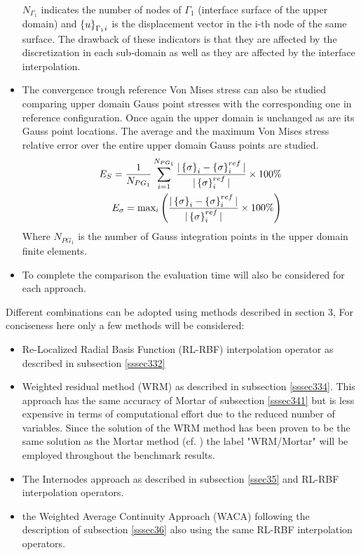 \begin{itemize}
\begin{eqnarray}
 \end{eqnarray}
 $N_{\Gamma_1}$ indicates the number of nodes of $\Gamma_1$ (interface surface  of the upper domain) and $\left\lbrace{u}\right \rbrace_{\Gamma_1i}$ is the displacement vector in the i-th node of the same surface.
 The drawback of these indicators is that they are affected by the discretization in each sub-domain as well as they are affected by the interface interpolation.
 \item The convergence trough reference Von Mises stress can also be studied comparing upper domain Gauss point stresses with the corresponding one in reference configuration. Once again the upper domain is unchanged as are its Gauss point locations. The average and the maximum Von Mises stress relative error over the entire upper domain Gauss points are studied.
 \begin{eqnarray}
 E_{S}=\frac{1}{N_{PG_1}}\sum_{i=1}^{N_{PG_1}}\frac{|\left\lbrace{\sigma}\right \rbrace_{i}-\left\lbrace{\sigma}\right \rbrace^{ref}_{i}|}{|\left\lbrace{\sigma}\right \rbrace^{ref}_{i}|}\times 100 \%  \\
 E_{\sigma}=
 \text{max}_i
  \left(\frac{|\left\lbrace{\sigma}\right \rbrace_{i}-\left\lbrace{\sigma}\right \rbrace^{ref}_{i}|}{|\left\lbrace{\sigma}\right \rbrace^{ref}_{i}|}\times 100 \%   \right) 
 \end{eqnarray}
 Where $N_{PG_1}$ is the number of Gauss integration points in the upper domain finite elements.
 \item To complete the comparison the evaluation time will also be considered for each approach.
 \end{itemize}
 Different combinations can be adopted using methods described in section 3, For conciseness here only a few methods will be considered:
 \begin{itemize}
     \item Re-Localized Radial Basis Function (RL-RBF) interpolation operator as described in subsection \ref{sssec332}
     \item Weighted residual method (WRM) as described in subsection \ref{sssec334}. This approach has the same accuracy of Mortar of subsection \ref{sssec341} but is less expensive in terms of computational effort due to the reduced number of variables. Since the solution of the WRM method has been proven to be the same solution as the Mortar method (cf. \cite{jeong2017element}) the label "WRM/Mortar" will be employed throughout the benchmark results.
     \item The Internodes approach as described in subsection \ref{ssec35} and RL-RBF interpolation operators. 
     \item the Weighted Average Continuity Approach (WACA) following the description of subsection \ref{sssec36} also using the same RL-RBF interpolation operators.
 \end{itemize}
